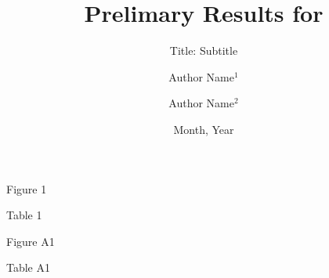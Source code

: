 \documentclass[
  ignorenonframetext,
  aspectratio=169]{beamer}
\title{Prelimary Results for}
\subtitle{Title: Subtitle}
\author{Author Name\(^1\) \and Author Name\(^2\)}
\date{Month, Year}
\institute{\(^1\)Institution \and \(^2\)Institution}
\begin{document}
\frame{\titlepage}

\begin{frame}{Figure 1}
\protect\hypertarget{figure-1}{}
\end{frame}

\begin{frame}{Table 1}
\protect\hypertarget{table-1}{}
\end{frame}

\begin{frame}{Figure A1}
\protect\hypertarget{figure-a1}{}
\end{frame}

\begin{frame}{Table A1}
\protect\hypertarget{table-a1}{}
\end{frame}
\end{document}
